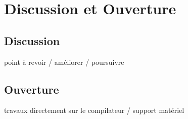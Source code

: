 \chapter*{Discussion et Ouverture}

\section*{Discussion}

point à revoir / améliorer / poursuivre


\section*{Ouverture}


travaux directement sur le compilateur / support matériel
